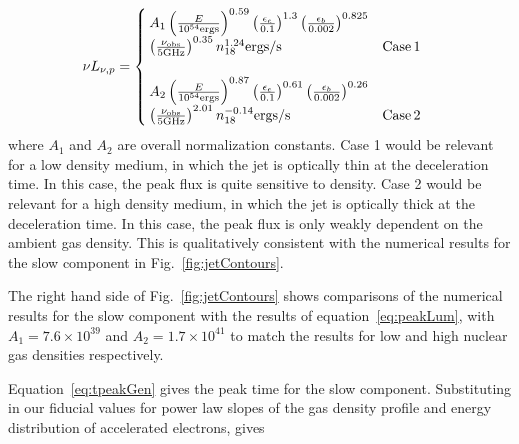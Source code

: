 \documentclass[usenatbib,fleqn]{mnras}
\begin{document}
\begin{align}
\nu L_{\nu, p}&=
\begin{cases}
  A_1 \left(\frac{E}{10^{54} {\rm ergs}}\right)^{0.59}
  \left(\frac{\epsilon_e}{0.1}\right)^{1.3}
  \left(\frac{\epsilon_b}{0.002}\right)^{0.825}\\
  \left(\frac{\nu_{\rm obs}}{5 {\rm GHz}}\right)^{0.35} n_{18}^{1.24} {\rm ergs/s} & {\rm Case \,1}\\\\
  A_2 \left(\frac{E}{10^{54} {\rm ergs}}\right)^{0.87}
  \left(\frac{\epsilon_e}{0.1}\right)^{0.61}
  \left(\frac{\epsilon_b}{0.002}\right)^{0.26}\\
  \left(\frac{\nu_{\rm obs}}{5 {\rm GHz}}\right)^{2.01} n_{18}^{-0.14}
  {\rm ergs/s} & {\rm Case \,2}
\end{cases}
\label{eq:peakLum}
\end{align}
%
where $A_1$ and $A_2$ are overall normalization constants.  Case 1
would be relevant for a low density medium, in which the jet is
optically thin at the deceleration time. In this case, the peak flux
is quite sensitive to density. Case 2 would be relevant for a high
density medium, in which the jet is optically thick at the
deceleration time. In this case, the peak flux is only weakly
dependent on the ambient gas density. This is qualitatively consistent
with the numerical results for the slow component in
Fig.~\ref{fig:jetContours}.

The right hand side of Fig.~\ref{fig:jetContours} shows comparisons of
the numerical results for the slow component with the results of
equation~\eqref{eq:peakLum}, with $A_1=7.6\times 10^{39}$ and $A_2=1.7
\times 10^{41}$ to match the results for low and high nuclear gas
densities respectively.

Equation~\eqref{eq:tpeakGen} gives the peak time for the slow
component. Substituting in our fiducial values for power law slopes of
the gas density profile and energy distribution of accelerated
electrons, gives
\end{document}
